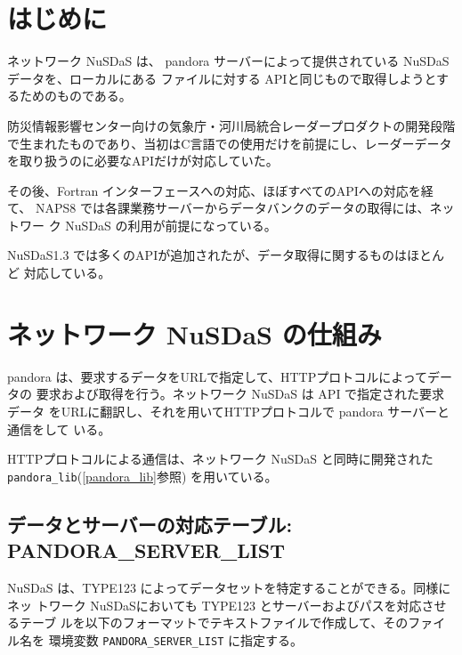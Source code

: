 
\section{はじめに}
ネットワーク NuSDaS は、
pandora サーバーによって提供されている NuSDaS データを、ローカルにある
ファイルに対する APIと同じもので取得しようとするためのものである。

防災情報影響センター向けの気象庁・河川局統合レーダープロダクトの開発段階
で生まれたものであり、当初はC言語での使用だけを前提にし、レーダーデータ
を取り扱うのに必要なAPIだけが対応していた。

その後、Fortran インターフェースへの対応、ほぼすべてのAPIへの対応を経て、
NAPS8 では各課業務サーバーからデータバンクのデータの取得には、ネットワー
ク NuSDaS の利用が前提になっている。

NuSDaS1.3 では多くのAPIが追加されたが、データ取得に関するものはほとんど
対応している。

\section{ネットワーク NuSDaS の仕組み}
pandora は、要求するデータをURLで指定して、HTTPプロトコルによってデータの
要求および取得を行う。ネットワーク NuSDaS は API で指定された要求データ
をURLに翻訳し、それを用いてHTTPプロトコルで pandora サーバーと通信をして
いる。

HTTPプロトコルによる通信は、ネットワーク NuSDaS と同時に開発された
{\tt pandora\_lib}(\ref{pandora_lib}参照) を用いている。
\subsection{データとサーバーの対応テーブル: PANDORA\_SERVER\_LIST}
NuSDaS は、TYPE123 によってデータセットを特定することができる。同様にネッ
トワーク NuSDaSにおいても TYPE123 とサーバーおよびパスを対応させるテーブ
ルを以下のフォーマットでテキストファイルで作成して、そのファイル名を
環境変数 {\tt PANDORA\_SERVER\_LIST} に指定する。

